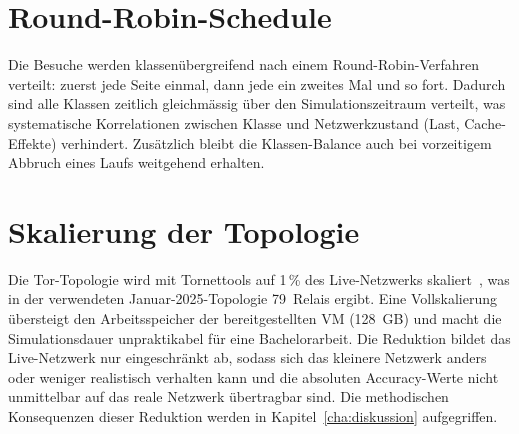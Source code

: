 \section{Round-Robin-Schedule}
\label{sec:konzepte_roundrobin}

Die Besuche werden klassenübergreifend nach einem Round-Robin-Verfahren verteilt: zuerst jede Seite einmal, dann jede ein zweites Mal und so fort.
Dadurch sind alle Klassen zeitlich gleichmässig über den Simulationszeitraum verteilt, was systematische Korrelationen zwischen Klasse und Netzwerkzustand (Last, Cache-Effekte) verhindert.
Zusätzlich bleibt die Klassen-Balance auch bei vorzeitigem Abbruch eines Laufs weitgehend erhalten.

\section{Skalierung der Topologie}
\label{sec:konzepte_skalierung}

Die Tor-Topologie wird mit Tornettools auf 1\,\% des Live-Netzwerks skaliert~\cite{neverenough-sec2021}, was in der verwendeten Januar-2025-Topologie 79~Relais ergibt.
Eine Vollskalierung übersteigt den Arbeitsspeicher der bereitgestellten VM (128~GB) und macht die Simulationsdauer unpraktikabel für eine Bachelorarbeit.
Die Reduktion bildet das Live-Netzwerk nur eingeschränkt ab, sodass sich das kleinere Netzwerk anders oder weniger realistisch verhalten kann und die absoluten Accuracy-Werte nicht unmittelbar auf das reale Netzwerk übertragbar sind.
Die methodischen Konsequenzen dieser Reduktion werden in Kapitel~\ref{cha:diskussion} aufgegriffen.